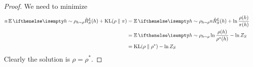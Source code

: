 \begin{proof}
  We need to minimize
  \begin{equation}
    \begin{split}
      n \Ev[h \sim \rho]{\hat{R}_S^L(h)} + \KL{\rho}{\pi}
      &= \Ev[h \sim \rho]{n \hat{R}_S^L(h) + \ln\frac{\rho(h)}{\pi(h)}} \\
      &= \Ev[h \sim \rho]{\ln\frac{\rho(h)}{\rho^*(h)}} - \ln Z_S \\
      &= \KL{\rho}{\rho^*} - \ln Z_S
    \end{split}
  \end{equation}
  Clearly the solution is $\rho = \rho^*$.
\end{proof}

